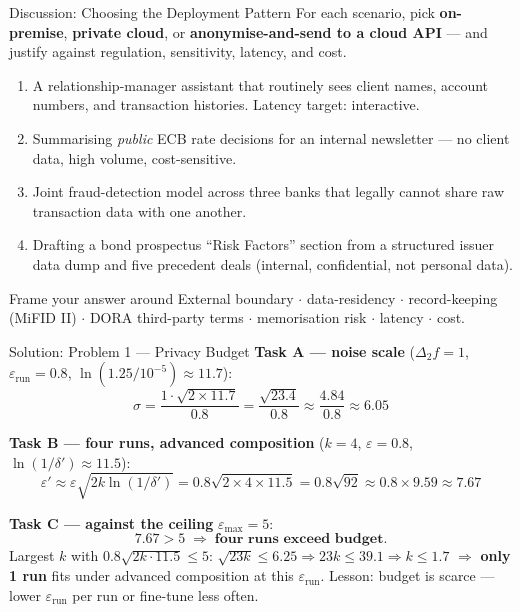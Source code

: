 \documentclass[9pt,t]{beamer}
\begin{document}
\begin{frame}{Discussion: Choosing the Deployment Pattern}
For each scenario, pick \textbf{on-premise}, \textbf{private cloud}, or
\textbf{anonymise-and-send to a cloud API} --- and justify against regulation,
sensitivity, latency, and cost.

\medskip
\begin{enumerate}
  \item A relationship-manager assistant that routinely sees client names, account
        numbers, and transaction histories. Latency target: interactive.
  \item Summarising \emph{public} ECB rate decisions for an internal newsletter ---
        no client data, high volume, cost-sensitive.
  \item Joint fraud-detection model across three banks that legally cannot share raw
        transaction data with one another.
  \item Drafting a bond prospectus ``Risk Factors'' section from a structured issuer
        data dump and five precedent deals (internal, confidential, not personal data).
\end{enumerate}

\medskip
\begin{block}{Frame your answer around}
External boundary $\cdot$ data-residency $\cdot$ record-keeping (MiFID II) $\cdot$
DORA third-party terms $\cdot$ memorisation risk $\cdot$ latency $\cdot$ cost.
\end{block}
\end{frame}

\begin{frame}{Solution: Problem 1 --- Privacy Budget}
\textbf{Task A --- noise scale} ($\Delta_2 f = 1$, $\varepsilon_{\text{run}}=0.8$,
$\ln(1.25/10^{-5})\approx 11.7$):
\[
\sigma = \frac{1 \cdot \sqrt{2 \times 11.7}}{0.8}
       = \frac{\sqrt{23.4}}{0.8} \approx \frac{4.84}{0.8} \approx 6.05
\]

\textbf{Task B --- four runs, advanced composition}
($k=4$, $\varepsilon=0.8$, $\ln(1/\delta')\approx 11.5$):
\[
\varepsilon' \approx \varepsilon\sqrt{2k\ln(1/\delta')}
= 0.8\sqrt{2\times4\times11.5}
= 0.8\sqrt{92} \approx 0.8 \times 9.59 \approx 7.67
\]

\textbf{Task C --- against the ceiling} $\varepsilon_{\max}=5$:
\[
7.67 > 5 \;\Rightarrow\; \textbf{four runs exceed budget.}
\]
Largest $k$ with $0.8\sqrt{2k\cdot 11.5}\le 5$: $\sqrt{23k}\le 6.25
\Rightarrow 23k \le 39.1 \Rightarrow k \le 1.7$ $\Rightarrow$ \textbf{only 1 run}
fits under advanced composition at this $\varepsilon_{\text{run}}$. Lesson: budget is
scarce --- lower $\varepsilon_{\text{run}}$ per run or fine-tune less often.
\end{frame}
\end{document}
